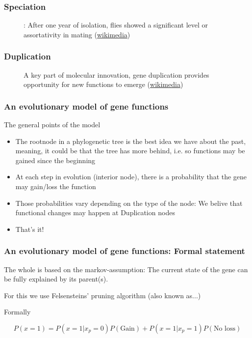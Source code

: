 \documentclass[aspectratio=169, 10pt]{beamer}
\begin{document}
\begin{frame}
\frametitle{Speciation}
\begin{figure}
\centering
\def\svgwidth{.9\linewidth}
\tiny

\caption{: After one year of isolation, flies showed a significant level or assortativity in mating (\href{https://commons.wikimedia.org/wiki/File:Drosophila_speciation_experiment.svg}{wikimedia})}
\end{figure}
\end{frame}

\begin{frame}
\frametitle{Duplication}
\begin{figure}
\centering
\def\svgwidth{.7\linewidth}
\tiny

\caption{A key part of molecular innovation, gene duplication provides opportunity for new functions to emerge (\href{https://en.wikipedia.org/wiki/File:Evolution_fate_duplicate_genes_-_vector.svg}{wikimedia})}
\end{figure}
\end{frame}


\begin{frame}
\frametitle{An evolutionary model of gene functions}

The general points of the model
\begin{itemize}
\item The rootnode in a phylogenetic tree is the best idea we have about the past, meaning,
it could be that the tree has more behind, i.e. so functions may be gained since the beginning
\item At each step in evolution (interior node), there is a probability that the gene may
gain/loss the function
\item Those probabilities vary depending on the type of the node: We belive that functional
changes may happen at Duplication nodes
\item That's it!
\end{itemize}
\end{frame}

\begin{frame}
\frametitle{An evolutionary model of gene functions: Formal statement}

The whole is based on the markov-assumption: The current state of the gene can be
fully explained by its parent(s).

For this we use Felsensteins' pruning algorithm (also known as...)

Formally

$$
P(x = 1) = P(x = 1| x_p = 0)P(\mbox{Gain}) + P(x = 1| x_p = 1)P(\mbox{No loss})
$$

\end{frame}
\end{document}
